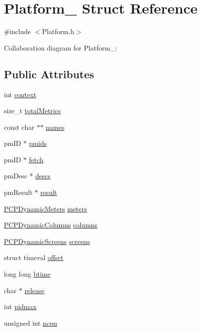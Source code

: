 \hypertarget{structPlatform__}{}\section{Platform\+\_\+ Struct Reference}
\label{structPlatform__}


{\ttfamily \#include $<$Platform.\+h$>$}



Collaboration diagram for Platform\+\_\+\+:
\subsection*{Public Attributes}
\begin{DoxyCompactItemize}
\item 
int \hyperlink{structPlatform___a141db1cf33d4c5ba1fdbeb4032ee0978}{context}
\item 
size\+\_\+t \hyperlink{structPlatform___a6cb286564fbef36dad84afc8a83c4cc1}{total\+Metrics}
\item 
const char $\ast$$\ast$ \hyperlink{structPlatform___a6220323f8042b7b41db8581f1f73c0e5}{names}
\item 
pm\+ID $\ast$ \hyperlink{structPlatform___a77e37e1b0e04a76267eab5ac96ddf170}{pmids}
\item 
pm\+ID $\ast$ \hyperlink{structPlatform___a4872f1140e65c929c70a8d2bd73728b6}{fetch}
\item 
pm\+Desc $\ast$ \hyperlink{structPlatform___a0d8371a3cdd14fb31725998a932f702f}{descs}
\item 
pm\+Result $\ast$ \hyperlink{structPlatform___a8f32d5f5114d26d0848af52ed45f2cf9}{result}
\item 
\hyperlink{PCPDynamicMeter_8h_a48e248f493f4a33a6cc077627adf147a}{P\+C\+P\+Dynamic\+Meters} \hyperlink{structPlatform___ab2d511f6539be67d83a0f9fcd4526103}{meters}
\item 
\hyperlink{PCPDynamicColumn_8h_a340cb3857a739ded09f30922e07f9a93}{P\+C\+P\+Dynamic\+Columns} \hyperlink{structPlatform___a9c827e0bbec0e84a498264254e1ae969}{columns}
\item 
\hyperlink{PCPDynamicScreen_8h_ac4af3d2340e57aa7f277ba32fb31d668}{P\+C\+P\+Dynamic\+Screens} \hyperlink{structPlatform___a095854bca9324865da5522935472c51a}{screens}
\item 
struct timeval \hyperlink{structPlatform___a5b817bbbea0b0a497f7059b8fd22c3b0}{offset}
\item 
long long \hyperlink{structPlatform___af6fe00b7f276115a84bcb4a4927effc5}{btime}
\item 
char $\ast$ \hyperlink{structPlatform___a0efe931491a2a83ee9f2c4e436526778}{release}
\item 
int \hyperlink{structPlatform___a779fb1f5e87f922ae15cb535ad8e6bb4}{pidmax}
\item 
unsigned int \hyperlink{structPlatform___a2e4bb7c1c5c7c7dfbbc800c8ba6346c6}{ncpu}
\end{DoxyCompactItemize}


